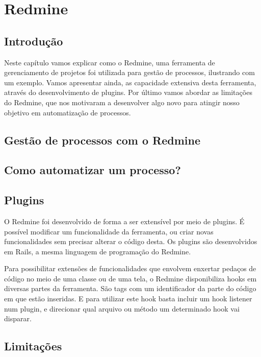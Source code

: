 \chapter{Redmine}\label{chp:LABEL_CHP_3}

\section{Introdução}\label{sec:LABEL_CHP_3_SEC_A}
Neste capítulo vamos explicar como o Redmine, uma ferramenta de gerenciamento de projetos foi utilizada para gestão de processos, ilustrando com um exemplo. Vamos apresentar ainda, as capacidade extensiva desta ferramenta, através do desenvolvimento de plugins. Por último vamos abordar as limitações do Redmine, que nos motivaram a desenvolver algo novo para atingir nosso objetivo em automatização de processos.

\section{Gestão de processos com o Redmine}\label{sec:LABEL_CHP_3_SEC_B}


\section{Como automatizar um processo?}\label{sec:LABEL_CHP_3_SEC_C}

\section{Plugins}\label{sec:LABEL_CHP_3_SEC_D}
O Redmine foi desenvolvido de forma a ser extensível por meio de plugins. É possível modificar um funcionalidade da ferramenta, ou criar novas funcionalidades sem precisar alterar o código desta. Os plugins são desenvolvidos em Rails, a mesma linguagem de programação do Redmine. 

Para possibilitar extensões de funcionalidades que envolvem enxertar pedaços de código no meio de uma classe ou de uma tela, o Redmine disponibiliza hooks em diversas partes da ferramenta. São tags com um identificador da parte do código em que estão inseridas. E para utilizar este hook basta incluir um hook listener num plugin, e direcionar qual arquivo ou método um determinado hook vai disparar.

\section{Limitações}\label{sec:LABEL_CHP_3_SEC_E}

